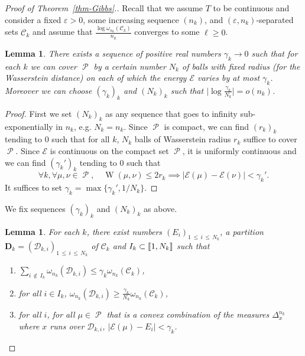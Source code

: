 \documentclass[10pt]{amsart}
\newtheorem{lemm}[theo]{Lemma}\newtheorem{prop}[theo]{Proposition}\newtheorem{coro}[theo]{Corollary}\newtheorem{conj}[theo]{Conjecture}
\theoremstyle{definition}\newtheorem{defi}[theo]{Definition}\newtheorem{rema}[theo]{Remark}\newtheorem{exam}[theo]{Example}\newtheorem{exem}[theo]{Example}\newtheorem{nota}[theo]{Notation}
\theoremstyle{plain}
\theoremstyle{plain}
\newcommand{\wass}{\operatorname{W}}
\newcommand\Prob{{\operatorname{\mathscr{P}}}}
\newcommand*\8{\infty}
\newcommand{\En}{\mathcal{E}}
\newcommand{\cD}{\mathcal{D}}
\newcommand{\cC}{\mathcal C}
\newcommand{\bfD}{\mathbf{D}}
\newcommand{\llbracket}{\mathopen{[\mkern -2.7mu[}}
\newcommand{\rrbracket}{\mathclose{]\mkern -2.7mu]}}
\newcommand*{\romanenumi}{\renewcommand*{\theenumi}{\roman{enumi}}}
\let\oldforall\forall
\renewcommand*{\forall}{\mathrel{\oldforall}}
\begin{document}
\begin{proof}[Proof of Theorem~\ref{thm-Gibbs}.]
Recall that we assume $T$ to be continuous and consider a fixed $\varepsilon>0$, some increasing sequence $(n_k)$, and $(\varepsilon,n_k)$-separated sets $\cC_k$ and assume that $\frac{\log \omega_{n_k}(\cC_k)}{n_k}$ converges to some $\ell\ge 0$.

\begin{lemm}
There exists a sequence of positive real numbers $\gamma_k\to 0$ such that for each $k$ we can cover $\Prob$ by a certain number $N_k$ of balls with fixed radius (for the Wasserstein distance) on each of which the energy $\En$ varies by at most $\gamma_k$. Moreover we can choose $(\gamma_k)_k$ and $(N_k)_k$ such that $\big\lvert\log\frac{\gamma_k}{N_k}\big\rvert=o(n_k)$.
\end{lemm}

\begin{proof}
First we set $(N_k)_k$ as any sequence that goes to infinity sub-exponentially in $n_k$, e.g. $N_k=n_k$. Since $\Prob$ is compact, we can find $(r_k)_k$ tending to $0$ such that for all $k$, $N_k$ balls of Wasserstein radius $r_k$ suffice to cover $\Prob$. Since $\En$ is continuous on the compact set $\Prob$, it is uniformly continuous and we can find $(\gamma_k')_k$ tending to $0$ such that
\[
\forall k,\forall \mu,\nu\in\Prob,\quad \wass(\mu,\nu)\le 2r_k \implies \lvert \En(\mu)-\En(\nu)\rvert < \gamma_k'.
\]
It suffices to set $\gamma_k=\max\{\gamma_k',1/N_k\}$.
\end{proof}

We fix sequences $(\gamma_k)_k$ and $(N_k)_k$ as above.

\begin{lemm}\label{lem-dividing}
For each $k$, there exist numbers $(E_i)_{1\,\le\,i\,\le\,N_k}$, a partition $\bfD_k=(\cD_{k,i})_{1\,\le\,i\,\le\,N_k}$ of $\cC_k$ and $I_k\subset \llbracket 1,N_k\rrbracket$ such that
\begin{enumerate}\romanenumi
\item\label{lemm2.8.1} $\sum_{i\,\notin\,I_k}\omega_{n_k}(\cD_{k,i})\le \gamma_k \omega_{n_k}(\cC_k)$,
\item\label{lemm2.8.2} for all $i\in I_k$, $\omega_{n_k}(\cD_{k,i})\ge \frac{\gamma_k}{N_k} \omega_{n_k}(\cC_k)$,
\item\label{enumi:dividing3}
for all $i$, for all $\mu\in\Prob$ that is a convex combination of the measures $\Delta_x^{n_k}$ where $x$ runs over $\cD_{k,i}$, $\lvert \En(\mu)-E_i\rvert < \gamma_k$.
\end{enumerate}
\end{lemm}


\end{proof}
\end{document}
